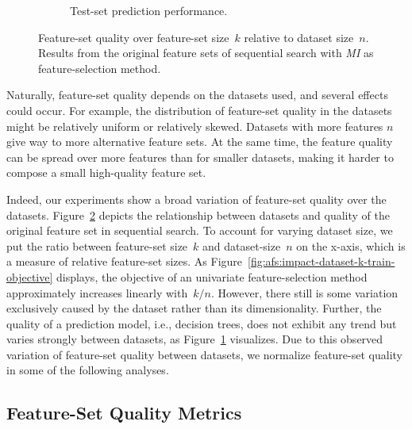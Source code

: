 \documentclass{article}
\theoremstyle{definition}
\begin{document}
\begin{figure}[htb]
\begin{subfigure}[t]{0.48\textwidth}
		\caption{Test-set prediction performance.}
		\label{fig:afs:impact-dataset-k-decision-tree-test-mcc}
	\end{subfigure}
	\caption{
		Feature-set quality over feature-set size~$k$ relative to dataset size~$n$.
		Results from the original feature sets of sequential search with \emph{MI} as feature-selection method.
	}
	\label{fig:afs:impact-dataset-k-quality}
\end{figure}

Naturally, feature-set quality depends on the datasets used, and several effects could occur.
For example, the distribution of feature-set quality in the datasets might be relatively uniform or relatively skewed.
Datasets with more features $n$ give way to more alternative feature sets.
At the same time, the feature quality can be spread over more features than for smaller datasets, making it harder to compose a small high-quality feature set.

Indeed, our experiments show a broad variation of feature-set quality over the datasets.
Figure~\ref{fig:afs:impact-dataset-k-quality} depicts the relationship between datasets and quality of the original feature set in sequential search.
To account for varying dataset size, we put the ratio between feature-set size~$k$ and dataset-size~$n$ on the x-axis, which is a measure of relative feature-set sizes.
As Figure~\ref{fig:afs:impact-dataset-k-train-objective} displays, the objective of an univariate feature-selection method approximately increases linearly with~$k/n$.
However, there still is some variation exclusively caused by the dataset rather than its dimensionality.
Further, the quality of a prediction model, i.e., decision trees, does not exhibit any trend but varies strongly between datasets, as Figure~\ref{fig:afs:impact-dataset-k-decision-tree-test-mcc} visualizes.
Due to this observed variation of feature-set quality between datasets, we normalize feature-set quality in some of the following analyses.

\subsection{Feature-Set Quality Metrics}
\label{sec:afs:evaluation:metrics}
\end{document}
